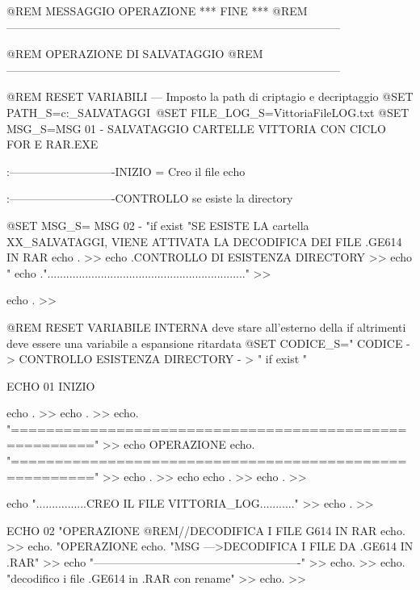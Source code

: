 \documentclass[10pt,a4paper]{book}
\begin{document}
{			@REM			MESSAGGIO OPERAZIONE *** FINE ***
			@REM -----------------------------------------------------------------------------------------
			
			
			@REM			OPERAZIONE DI SALVATAGGIO
			@REM -----------------------------------------------------------------------------------------
			
			@REM RESET VARIABILI --- Imposto la path di criptagio e decriptaggio
			@SET PATH_S=c:\Casa\CDM\Vittoria\XX_SALVATAGGI\
			@SET FILE_LOG_S=VittoriaFileLOG.txt
			@SET MSG_S=MSG 01 - SALVATAGGIO CARTELLE VITTORIA CON CICLO FOR E RAR.EXE
			
			
			
			:----------------------------INIZIO = Creo il file
			echo %
			
			:----------------------------CONTROLLO se esiste la directory 
			
			
			@SET MSG_S= MSG 02 - "if exist "SE ESISTE LA cartella XX_SALVATAGGI, VIENE ATTIVATA LA DECODIFICA DEI FILE .GE614 IN RAR
			echo .											>> %
			echo .CONTROLLO DI ESISTENZA DIRECTORY							>> %
			echo "%
			echo ."..............................................................." 		>> %
			
			echo .											>> %
			
			@REM RESET VARIABILE INTERNA deve stare all'esterno della if altrimenti deve essere una variabile a espansione ritardata
			@SET CODICE_S=" CODICE -> CONTROLLO ESISTENZA DIRECTORY - > "
			if exist "%
			
			ECHO 01 INIZIO %
			
			echo .										>> %
			echo .										>> %
			echo. "======================================================="			>> %
			echo   OPERAZIONE %
			echo. "======================================================="			>> %
			echo .										>> %
			echo %
			echo .										>> %
			echo .										>> %
			
			echo "................CREO IL FILE VITTORIA_LOG..........."			>> %
			echo .										>> %
			
			
			ECHO 02 "OPERAZIONE %
			@REM//DECODIFICA I FILE G614 IN RAR
			echo.										>> %
			echo. "OPERAZIONE %
			echo. "MSG --->DECODIFICA I FILE DA .GE614 IN .RAR"				>> %
			echo "-------------------------------------------------------"  		>> %
			echo.										>> %
			echo. "decodifico i file .GE614 in .RAR con rename"				>> %
			echo.										>> %
			
}
\end{document}
